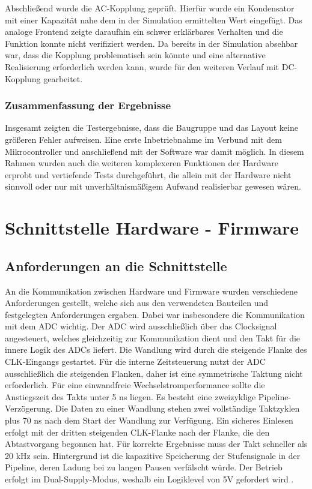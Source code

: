 \documentclass[a4paper, portrait, 12pt]{scrartcl} %
\begin{document}
Abschließend wurde die AC-Kopplung geprüft. Hierfür wurde ein Kondensator mit einer Kapazität nahe dem in der Simulation ermittelten Wert eingefügt. Das analoge Frontend zeigte daraufhin ein schwer erklärbares Verhalten und die Funktion konnte nicht verifiziert werden. Da bereits in der Simulation absehbar war, dass die Kopplung problematisch sein könnte und eine alternative Realisierung erforderlich werden kann, wurde für den weiteren Verlauf mit DC-Kopplung gearbeitet.

\subsubsection{Zusammenfassung der Ergebnisse}

Insgesamt zeigten die Testergebnisse, dass die Baugruppe und das Layout keine größeren Fehler aufweisen. Eine erste Inbetriebnahme im Verbund mit dem Mikrocontroller und anschließend mit der Software war damit möglich. In diesem Rahmen wurden auch die weiteren komplexeren Funktionen der Hardware erprobt und vertiefende Tests durchgeführt, die allein mit der Hardware nicht sinnvoll oder nur mit unverhältnismäßigem Aufwand realisierbar gewesen wären.

\pagebreak

\section{Schnittstelle Hardware - Firmware}

\subsection{Anforderungen an die Schnittstelle}
\label{subsec:requirements_hw_fw_interface}

An die Kommunikation zwischen Hardware und Firmware wurden verschiedene Anforderungen gestellt, welche sich aus den verwendeten Bauteilen und festgelegten Anforderungen ergaben. Dabei war insbesondere die Kommunikation mit dem ADC wichtig. Der ADC wird ausschließlich über das Clocksignal angesteuert, welches gleichzeitig zur Kommunikation dient und den Takt für die innere Logik des ADCs liefert. Die Wandlung wird durch die steigende Flanke des CLK-Eingangs gestartet. Für die interne Zeitsteuerung nutzt der ADC ausschließlich die steigenden Flanken, daher ist eine symmetrische Taktung nicht erforderlich. Für eine einwandfreie Wechselstromperformance sollte die Anstiegszeit des Takts unter 5 ns liegen. Es besteht eine zweizyklige Pipeline-Verzögerung. Die Daten zu einer Wandlung stehen zwei vollständige Taktzyklen plus 70 ns nach dem Start der Wandlung zur Verfügung. Ein sicheres Einlesen erfolgt mit der dritten steigenden CLK-Flanke nach der Flanke, die den Abtastvorgang begonnen hat. Für korrekte Ergebnisse muss der Takt schneller als 20 kHz sein. Hintergrund ist die kapazitive Speicherung der Stufensignale in der Pipeline, deren Ladung bei zu langen Pausen verfälscht würde. Der Betrieb erfolgt im Dual-Supply-Modus, weshalb ein Logiklevel von 5V gefordert wird \cite[S. 8 u. 12]{LinearTechnology1420}.
\end{document}
